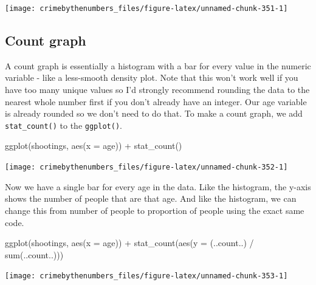 \documentclass[
]{krantz}
\makeatletter
\newenvironment{Shaded}{\begin{snugshade}}{\end{snugshade}}
\newcommand{\AttributeTok}[1]{\textcolor[rgb]{0.61,0.61,0.61}{#1}}
\newcommand{\FunctionTok}[1]{\textcolor[rgb]{0,0,0}{#1}}
\newcommand{\NormalTok}[1]{#1}
\newcommand{\SpecialCharTok}[1]{\textcolor[rgb]{0,0,0}{#1}}
\newenvironment{kframe}{%
\medskip{}
\setlength{\fboxsep}{.8em}
 \def\at@end@of@kframe{}%
 \ifinner\ifhmode%
  \def\at@end@of@kframe{\end{minipage}}%
  \begin{minipage}{\columnwidth}%
 \fi\fi%
 \def\FrameCommand##1{\hskip\@totalleftmargin \hskip-\fboxsep
 \colorbox{shadecolor}{##1}\hskip-\fboxsep
     \hskip-\linewidth \hskip-\@totalleftmargin \hskip\columnwidth}%
 \MakeFramed {\advance\hsize-\width
   \@totalleftmargin\z@ \linewidth\hsize
   \@setminipage}}%
 {\par\unskip\endMakeFramed%
 \at@end@of@kframe}
\renewenvironment{Shaded}{\begin{kframe}}{\end{kframe}}
\makeatother
\begin{document}
\begin{center}\texttt{[image: crimebythenumbers\_files/figure-latex/unnamed-chunk-351-1]} \end{center}

\hypertarget{count-graph}{%
\subsection{Count graph}\label{count-graph}}

A count graph is essentially a histogram with a bar for
every value in the numeric variable - like a less-smooth
density plot. Note that this won't work well if you have too
many unique values so I'd strongly recommend rounding the
data to the nearest whole number first if you don't already
have an integer. Our age variable is already rounded so we
don't need to do that. To make a count graph, we add
\texttt{stat\_count()} to the \texttt{ggplot()}.

\begin{Shaded}
\begin{Highlighting}[]
\FunctionTok{ggplot}\NormalTok{(shootings, }\FunctionTok{aes}\NormalTok{(}\AttributeTok{x =}\NormalTok{ age)) }\SpecialCharTok{+}
  \FunctionTok{stat\_count}\NormalTok{()}
\end{Highlighting}
\end{Shaded}

\begin{center}\texttt{[image: crimebythenumbers\_files/figure-latex/unnamed-chunk-352-1]} \end{center}

Now we have a single bar for every age in the data. Like the
histogram, the y-axis shows the number of people that are
that age. And like the histogram, we can change this from
number of people to proportion of people using the exact
same code.

\begin{Shaded}
\begin{Highlighting}[]
\FunctionTok{ggplot}\NormalTok{(shootings, }\FunctionTok{aes}\NormalTok{(}\AttributeTok{x =}\NormalTok{ age)) }\SpecialCharTok{+}
  \FunctionTok{stat\_count}\NormalTok{(}\FunctionTok{aes}\NormalTok{(}\AttributeTok{y =}\NormalTok{ (..count..) }\SpecialCharTok{/} \FunctionTok{sum}\NormalTok{(..count..)))}
\end{Highlighting}
\end{Shaded}

\begin{center}\texttt{[image: crimebythenumbers\_files/figure-latex/unnamed-chunk-353-1]} \end{center}
\end{document}
